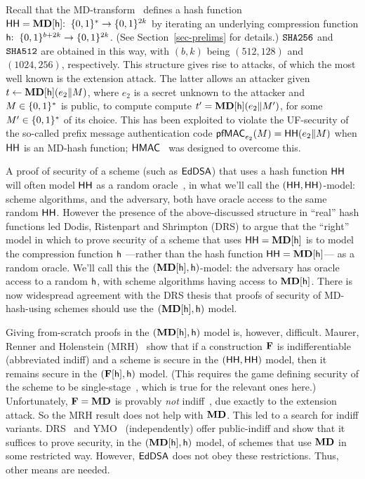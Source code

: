 

 
 Recall that the MD-transform~\cite{C:Merkle89a,C:Damgaard89b} defines a hash function $\mathsf{HH} = \mathbf{MD}[\mathsf{h}] {:\;\;}\{0,1\}^*\to\{0,1\}^{2k}$ by iterating an underlying compression function $\mathsf{h}{:\;\;}\{0,1\}^{b+2k}\to\{0,1\}^{2k}$. (See Section~\ref{sec-prelims} for details.) $\texttt{SHA256}$ and $\texttt{SHA512}$ are obtained in this way, with $(b, k)$ being $(512, 128)$ and $(1024, 256)$, respectively. This structure gives rise to attacks, of which the most well known is the extension attack. The latter allows an attacker given $t \gets \mathbf{MD}[\mathsf{h}](e_2\|M)$, where $e_2$ is a secret unknown to the attacker and $M\in\{0,1\}^*$ is public, to compute compute $t'=\mathbf{MD}[\mathsf{h}](e_2\|M')$, for some $M'\in\{0,1\}^{*}$ of its choice. This has been exploited to violate the UF-security of the so-called prefix message authentication code $\mathsf{pfMAC}_{e_2}(M) = \mathsf{HH}(e_2\|M)$ when $\mathsf{HH}$ is an MD-hash function; $\mathsf{HMAC}$~\cite{C:BelCanKra96} was designed to overcome this.

A proof of security of a scheme (such as $\mathsf{EdDSA}$) that uses a hash function $\mathsf{HH}$ will often model $\mathsf{HH}$ as a random oracle~\cite{CCS:BelRog93}, in what we'll call the $(\mathsf{HH},\mathsf{HH})$-model: scheme algorithms, and the adversary, both have oracle access to the same random $\mathsf{HH}$.  However the presence of the above-discussed structure in ``real'' hash functions led Dodis, Ristenpart and Shrimpton (DRS) \cite{EC:DodRisShr09} to argue that the ``right'' model in which to prove security of a scheme that uses $\mathsf{HH} = \mathbf{MD}[\mathsf{h}]$ is to model the compression function $\mathsf{h}$ ---rather than the hash function $\mathsf{HH}=\mathbf{MD}[\mathsf{h}]$--- as a random oracle. We'll call this the $(\mathbf{MD}[\mathsf{h}],\mathsf{h})$-model: the adversary has oracle access to a random $\mathsf{h}$, with scheme algorithms having access to $\mathbf{MD}[\mathsf{h}]$. There is now widespread agreement with the DRS thesis that proofs of security of MD-hash-using schemes should use the $(\mathbf{MD}[\mathsf{h}],\mathsf{h})$ model.

Giving from-scratch proofs in the $(\mathbf{MD}[\mathsf{h}],\mathsf{h})$ model is, however, difficult. Maurer, Renner and Holenstein (MRH)~\cite{TCC:MauRenHol04} show that if a construction $\mathbf{F}$ is indifferentiable (abbreviated indiff) and a scheme is secure in the $(\mathsf{HH},\mathsf{HH})$ model, then it remains secure in the $(\mathbf{F}[\mathsf{h}],\mathsf{h})$ model. (This requires the game defining security of the scheme to be single-stage~\cite{EC:RisShaShr11}, which is true for the relevant ones here.)
Unfortunately, $\mathbf{F}=\mathbf{MD}$ is provably \textit{not} indiff~\cite{C:CDMP05}, due exactly to the extension attack. So the MRH result does not help with $\mathbf{MD}$. This led to a search for indiff variants. DRS~\cite{EC:DodRisShr09} and YMO~\cite{yoneyama2009leaky} (independently) offer public-indiff and show that it suffices to prove security, in the $(\mathbf{MD}[\mathsf{h}],\mathsf{h})$ model, of schemes that use $\mathbf{MD}$ in some restricted way. However, $\mathsf{EdDSA}$ does not obey these restrictions. Thus, other means are needed.




